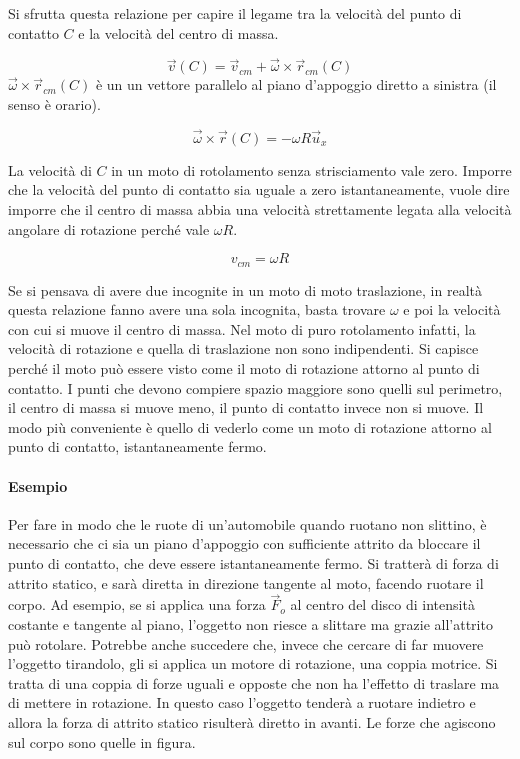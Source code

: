 Si sfrutta questa relazione per capire il legame tra la velocità del punto di contatto $C$ e la velocità del centro di massa.

\[
	\vec{v} (C) = \vec{v}_{cm} + \vec{\omega}\times \vec{r}_{cm}(C)
\]
$\vec{\omega}\times \vec{r}_{cm}(C)$ è un un vettore parallelo al piano d'appoggio diretto a sinistra (il senso è orario).

\[
	\vec{\omega} \times \vec{r}(C) = -\omega R \vec{u}_x
\]

La velocità di $C$ in un moto di rotolamento senza strisciamento vale zero. Imporre che la velocità del punto di contatto sia uguale a zero istantaneamente, vuole dire imporre che il centro di massa abbia una velocità strettamente legata alla velocità angolare di rotazione perché vale $\omega R$.

\[
	\boxed{v_{cm} = \omega R}
\]

Se si pensava di avere due incognite in un moto di moto traslazione, in realtà questa relazione fanno avere una sola incognita,  basta trovare $\omega$ e poi la velocità con cui si muove il centro di massa. Nel moto di puro rotolamento infatti, la velocità di rotazione e quella di traslazione non sono indipendenti.
Si capisce perché il moto può essere visto come il moto di rotazione attorno al punto di contatto. I punti che devono compiere spazio maggiore sono quelli sul perimetro, il centro di massa si muove meno, il punto di contatto invece non si muove. Il modo più conveniente è quello di vederlo come un moto di rotazione attorno al punto di contatto, istantaneamente fermo.

\paragraph{Esempio} Per fare in modo che le ruote di un'automobile quando ruotano non slittino, è necessario che ci sia un piano d'appoggio con sufficiente attrito da bloccare il punto di contatto, che deve essere istantaneamente fermo. Si tratterà di forza di attrito statico, e sarà diretta in direzione tangente al moto, facendo ruotare il corpo. Ad esempio, se si applica una forza $\vec{F}_o$ al centro del disco di intensità costante e tangente al piano, l'oggetto non riesce a slittare ma grazie all'attrito può rotolare. Potrebbe anche succedere che, invece che cercare di far muovere l'oggetto tirandolo, gli si applica un motore di rotazione, una coppia motrice. Si tratta di una coppia di forze uguali e opposte che non ha l'effetto di traslare ma di mettere in rotazione. In questo caso l'oggetto tenderà a ruotare indietro e allora la forza di attrito statico risulterà diretto in avanti. Le forze che agiscono sul corpo sono quelle
in figura.

